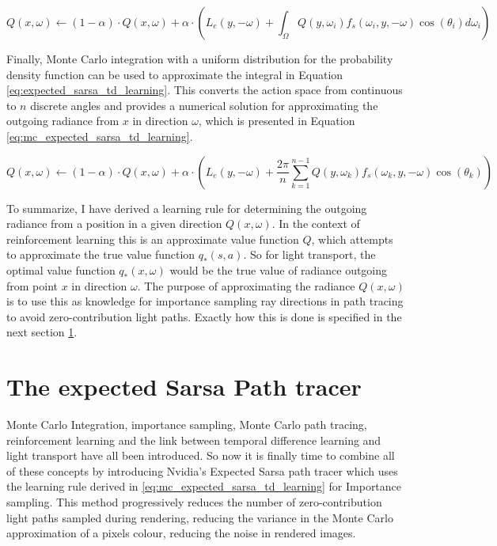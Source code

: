 \documentclass[ %
                    author={Callum Pearce},
                supervisor={Dr. Neill Campbell},
                    degree={MEng},
                     title={How effective are Temporal difference learning methods for reducing the number of zero contribution light paths, while still accurately approximating Global Illumination in Path tracing?},
                  subtitle={},
                      type={research},
                      year={2019} ]{dissertation}
\begin{document}
\begin{equation}
Q(x, \omega) \leftarrow (1 - \alpha) \cdot Q(x, \omega) + \alpha \cdot \left( L_e(y, -\omega) + \int_\Omega Q(y, \omega_i) f_s(\omega_i, y, -\omega) \cos(\theta_i) d\omega_i \right)
\label{eq:expected_sarsa_td_learning}
\end{equation}

Finally, Monte Carlo integration with a uniform distribution for the probability density function can be used to approximate the integral in Equation \ref{eq:expected_sarsa_td_learning}. This converts the action space from continuous to $n$ discrete angles and provides a numerical solution for approximating the outgoing radiance from $x$ in direction $\omega$, which is presented in Equation \ref{eq:mc_expected_sarsa_td_learning}.

\begin{equation}
Q(x, \omega) \leftarrow (1 - \alpha) \cdot Q(x, \omega) + \alpha \cdot \left( L_e(y, -\omega) +\frac{2 \pi}{n} \sum_{k=1}^{n-1} Q(y, \omega_k) f_s(\omega_k, y, -\omega) \cos(\theta_k)  \right)
\label{eq:mc_expected_sarsa_td_learning}
\end{equation}

To summarize, I have derived a learning rule for determining the outgoing radiance from a position in a given direction $Q(x, \omega)$. In the context of reinforcement learning this is an approximate value function $Q$, which attempts to approximate the true value function $q_*(s,a)$. So for light transport, the optimal value function $q_*(x, \omega)$ would be the true value of radiance outgoing from point $x$ in direction $\omega$. The purpose of approximating the radiance $Q(x, \omega)$ is to use this as knowledge for importance sampling ray directions in path tracing to avoid zero-contribution light paths. Exactly how this is done is specified in the next section \ref{sec:expecte_sarsa_path_tracer}.

\section{The expected Sarsa Path tracer}
\label{sec:expecte_sarsa_path_tracer}
Monte Carlo Integration, importance sampling, Monte Carlo path tracing, reinforcement learning and the link between temporal difference learning and light transport have all been introduced. So now it is finally time to combine all of these concepts by introducing Nvidia's Expected Sarsa path tracer which uses the learning rule derived in \ref{eq:mc_expected_sarsa_td_learning} for Importance sampling. This method progressively reduces the number of zero-contribution light paths sampled during rendering, reducing the variance in the Monte Carlo approximation of a pixels colour, reducing the noise in rendered images. 
\end{document}
